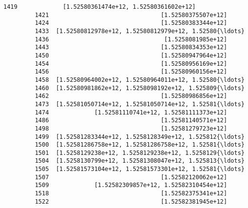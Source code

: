 \documentclass[11pt]{article}
\begin{document}
\begin{Verbatim}[commandchars=\\\{\}]
         1419             [1.52580361474e+12, 1.52580361602e+12]   
         1421                                [1.52580375507e+12]   
         1424                                [1.52580383344e+12]   
         1433  [1.52580812978e+12, 1.52580812979e+12, 1.52580{\ldots}   
         1436                                 [1.5258081985e+12]   
         1443                                [1.52580834353e+12]   
         1450                                [1.52580947964e+12]   
         1454                                [1.52580956169e+12]   
         1456                                [1.52580960156e+12]   
         1458  [1.52580964002e+12, 1.52580964011e+12, 1.52580{\ldots}   
         1460  [1.52580981862e+12, 1.5258098192e+12, 1.525809{\ldots}   
         1462                                [1.52580986856e+12]   
         1473  [1.52581050714e+12, 1.52581050714e+12, 1.52581{\ldots}   
         1474             [1.52581110741e+12, 1.52581111373e+12]   
         1486                                [1.52581140571e+12]   
         1498                                [1.52581279723e+12]   
         1499  [1.52581283344e+12, 1.5258128349e+12, 1.525812{\ldots}   
         1500  [1.52581286758e+12, 1.52581286758e+12, 1.52581{\ldots}   
         1501  [1.5258129238e+12, 1.5258129238e+12, 1.5258129{\ldots}   
         1504  [1.5258130799e+12, 1.52581308047e+12, 1.525813{\ldots}   
         1505  [1.52581573104e+12, 1.52581573301e+12, 1.52581{\ldots}   
         1507                                [1.52582120062e+12]   
         1509             [1.52582309857e+12, 1.52582310454e+12]   
         1518                                [1.52582375341e+12]   
         1522                                [1.52582381945e+12]   
         

\end{Verbatim}
\end{document}
